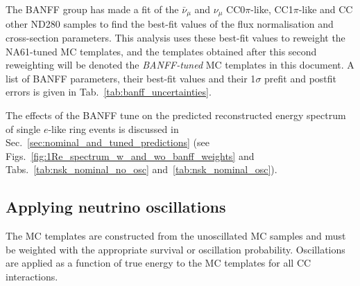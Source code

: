The BANFF group has made a fit of the $\bar{\nu}_\mu$ and  $\nu_\mu$ CC0$\pi$-like, CC1$\pi$-like and CC other ND280 samples 
to find the best-fit values of the flux normalisation and cross-section parameters\cite{BANFF2015}. This 
analysis uses these best-fit values to reweight the NA61-tuned MC templates, and the templates obtained after this second 
reweighting will be denoted the {\em BANFF-tuned} MC templates in this document.
A list of BANFF parameters, their best-fit values and their 1$\sigma$ prefit and postfit errors is given in Tab.~\ref{tab:banff_uncertainties}.

The effects of the BANFF tune on the predicted reconstructed energy spectrum of single $e$-like ring events is discussed 
in Sec.~\ref{sec:nominal_and_tuned_predictions} (see Figs.~\ref{fig:1Re_spectrum_w_and_wo_banff_weights} and Tabs.~\ref{tab:nsk_nominal_no_osc} and~\ref{tab:nsk_nominal_osc}). 


\subsection{Applying neutrino oscillations}
\label{sec:applying_oscillations}

The MC templates are constructed from the unoscillated MC samples and must be weighted with the appropriate survival or oscillation 
probability. Oscillations are applied as a function of true energy to the
  MC templates for all CC interactions.

